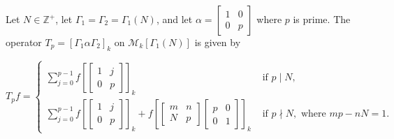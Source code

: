  \begin{proposition}
     Let $N \in \mathbb{Z}^{+}$, let $\Gamma_{1}=\Gamma_{2}=\Gamma_{1}(N)$, and let $\alpha=\left[\begin{array}{cc}1 & 0 \\ 0 & p\end{array}\right]$ where $p$ is prime. The operator $T_{p}=\left[\Gamma_{1} \alpha \Gamma_{2}\right]_{k}$ on $\mathcal{M}_{k}\left[\Gamma_{1}(N)\right]$ is given by

$$
T_{p} f= \begin{cases}\sum_{j=0}^{p-1} f\left[\left[\begin{array}{ll}
1 & j \\
0 & p
\end{array}\right]\right]_{k} & \text { if } p \mid N, \\
\sum_{j=0}^{p-1} f\left[\left[\begin{array}{ll}
1 & j \\
0 & p
\end{array}\right]\right]_{k}+f\left[\left[\begin{array}{ll}
m & n \\
N & p
\end{array}\right]\left[\begin{array}{ll}
p & 0 \\
0 & 1
\end{array}\right]\right]_{k} & \text { if } p \nmid N, \text { where } m p-n N=1 .\end{cases}
$$

\end{proposition}
